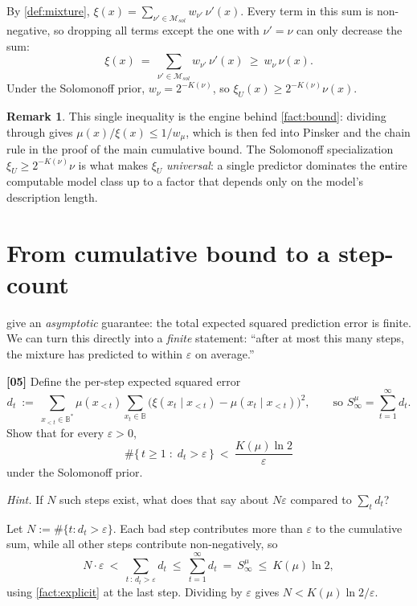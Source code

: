 \documentclass[fontsize=11pt, parskip=half]{scrartcl}
\theoremstyle{definition}
\newtheorem{remark}[theorem]{Remark}
\newenvironment{solution}{%
    \begin{tcolorbox}[colback=black!5!white, colframe=black!50!white,
      title={\textbf{Solution}}, fonttitle=\normalfont, breakable]
  }{\end{tcolorbox}}
\newenvironment{solution}{\expandafter\comment}{\expandafter\endcomment}
\newcommand{\Msol}{\mathcal{M}_{sol}}
\begin{document}
\begin{solution}
By \cref{def:mixture}, $\xi(x) = \sum_{\nu' \in \Msol} w_{\nu'} \,\nu'(x)$.
Every term in this sum is non-negative, so dropping all terms except the one with
$\nu' = \nu$ can only decrease the sum:
\[
  \xi(x) ~=~ \sum_{\nu' \in \Msol} w_{\nu'}\, \nu'(x)
  ~\geq~ w_\nu\, \nu(x).
\]
Under the Solomonoff prior, $w_\nu = 2^{-K(\nu)}$, so
$\xi_U(x) \geq 2^{-K(\nu)} \nu(x)$. \qedhere
\end{solution}

\begin{remark}
This single inequality is the engine behind \cref{fact:bound}: dividing through
gives $\mu(x)/\xi(x) \leq 1/w_\mu$, which is then fed into Pinsker and the chain
rule in the proof of the main cumulative bound. The Solomonoff specialization
$\xi_U \geq 2^{-K(\nu)} \nu$ is what makes $\xi_U$ \emph{universal}: a single
predictor dominates the entire computable model class up to a factor that depends
only on the model's description length.
\end{remark}

\section{From cumulative bound to a step-count}\label{prob:error_count}

 give an \emph{asymptotic} guarantee: the total
expected squared prediction error is finite. We can turn this directly into a
\emph{finite} statement: ``after at most this many steps, the mixture has
predicted to within $\varepsilon$ on average.''

\bigskip

\noindent
\textbf{[05]} Define the per-step expected squared error
\[
  d_t ~:=~ \sum_{x_{<t} \in \mathbb{B}^*} \mu(x_{<t})
    \sum_{x_t \in \mathbb{B}} \big(\xi(x_t \mid x_{<t}) - \mu(x_t \mid x_{<t})\big)^2,
  \qquad \text{so } S^\mu_\infty = \sum_{t=1}^\infty d_t.
\]
Show that for every $\varepsilon > 0$,
\[
  \#\big\{\, t \geq 1 \;:\; d_t > \varepsilon \,\big\}
  ~<~ \frac{K(\mu) \ln 2}{\varepsilon}
\]
under the Solomonoff prior.

\textit{Hint.} If $N$ such steps exist, what does that say about
$N\varepsilon$ compared to $\sum_t d_t$?

\begin{solution}
Let $N := \#\{t : d_t > \varepsilon\}$. Each bad step contributes more than
$\varepsilon$ to the cumulative sum, while all other steps contribute
non-negatively, so
\[
  N \cdot \varepsilon ~<~ \sum_{t \, : \, d_t > \varepsilon} d_t
  ~\leq~ \sum_{t=1}^\infty d_t ~=~ S^\mu_\infty ~\leq~ K(\mu) \ln 2,
\]
using \cref{fact:explicit} at the last step. Dividing by $\varepsilon$ gives
$N < K(\mu) \ln 2 / \varepsilon$. \qedhere
\end{solution}
\end{document}
